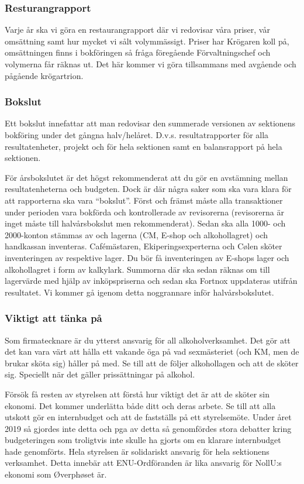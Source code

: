 \documentclass[10pt]{article}
\begin{document}
\subsubsection{Resturangrapport}
Varje år ska vi göra en restaurangrapport där vi redovisar våra priser, vår omsättning samt hur mycket vi sålt volymmässigt. Priser har Krögaren koll på, omsättningen finns i bokföringen så fråga föregående Förvaltningschef och volymerna får räknas ut. Det här kommer vi göra tillsammans med avgående och pågående krögartrion.

\subsubsection{Bokslut}
Ett bokslut innefattar att man redovisar den summerade versionen av sektionens bokföring under det gångna halv/helåret. D.v.s. resultatrapporter för alla resultatenheter, projekt och för hela sektionen samt en balansrapport på hela sektionen. 

För årsbokslutet är det högst rekommenderat att du gör en avstämning mellan resultatenheterna och budgeten.
Dock är där några saker som ska vara klara för att rapporterna ska vara “bokslut”. 
Först och främst måste alla transaktioner under perioden vara bokförda och kontrollerade av revisorerna (revisorerna är inget måste till halvårsbokslut men rekommenderat). Sedan ska alla 1000- och 2000-konton stämmas av och lagerna (CM, E-shop och alkohollagret) och handkassan inventeras. 
Cafémästaren, Ekiperingsexperterna och Cølen sköter inventeringen av respektive lager. Du bör få inventeringen av E-shops lager och alkohollagret i form av kalkylark. Summorna där ska sedan räknas om till lagervärde med hjälp av inköpspriserna och sedan ska Fortnox uppdateras utifrån resultatet. Vi kommer gå igenom detta noggrannare inför halvårsbokslutet. 

\subsubsection{Viktigt att tänka på}
Som firmatecknare är du ytterst ansvarig för all alkoholverksamhet. Det gör att det kan vara värt att hålla ett vakande öga på vad sexmästeriet (och KM, men de brukar sköta sig) håller på med. Se till att de följer alkohollagen och att de sköter sig. Speciellt när det gäller prissättningar på alkohol.

Försök få resten av styrelsen att förstå hur viktigt det är att de sköter sin ekonomi. Det kommer underlätta både ditt och deras arbete. Se till att alla utskott gör en internbudget och
att de fastställs på ett styrelsemöte. Under året 2019 så gjordes inte detta och pga av detta så genomfördes stora debatter kring budgeteringen som troligtvis inte skulle ha gjorts om en klarare internbudget hade genomförts. 
Hela styrelsen är solidariskt ansvarig för hela sektionens verksamhet. Detta innebär att ENU-Ordföranden är lika ansvarig för NollU:s ekonomi som Øverphøset är.
\end{document}
